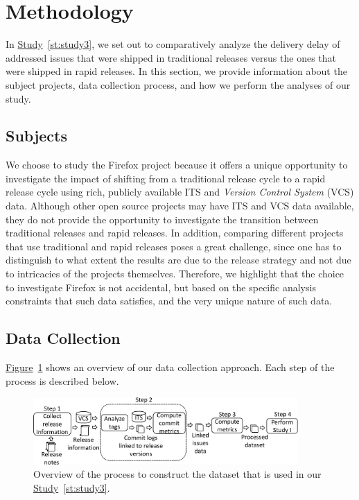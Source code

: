 \section{Methodology} \label{sec:studysettings}

In \hyperref[st:study3]{Study}~\ref{st:study3}, we set out to comparatively
analyze the delivery delay of addressed issues that were shipped in traditional
releases versus the ones that were shipped in rapid releases. In this section,
we provide information about the subject projects, data collection process, and
how we perform the analyses of our study.

\subsection{Subjects}

We choose to study the Firefox project because it offers a unique opportunity to
investigate the impact of shifting from a traditional release cycle to a rapid
release cycle using rich, publicly available ITS and \textit{Version Control
System} (VCS) data. Although other open source projects may have ITS and VCS
data available, they do not provide the opportunity to investigate the
transition between traditional releases and rapid releases. In addition,
comparing different projects that use traditional and rapid releases poses a
great challenge, since one has to distinguish to what extent the results are due
to the release strategy and not due to intricacies of the projects themselves.
Therefore, we highlight that the choice to investigate Firefox is not
accidental, but based on the specific analysis constraints that such data
satisfies, and the very unique nature of such data.

\subsection{Data Collection}\label{ch5:datacollection}

\hyperref[fig:database_construction]{Figure}~\ref{fig:database_construction}
shows an overview of our data collection approach. Each step of the process is
described below.

\begin{figure}[!]
	\centering
	\includegraphics[width=0.90\textwidth,keepaspectratio]
	{chapters/chapter5/figures/database_construction_final.pdf}
	\caption{
		Overview of the process to construct the dataset that is used in
		our \hyperref[st:study3]{Study}~\ref{st:study3}.
	}
	\label{fig:database_construction}
\end{figure}

